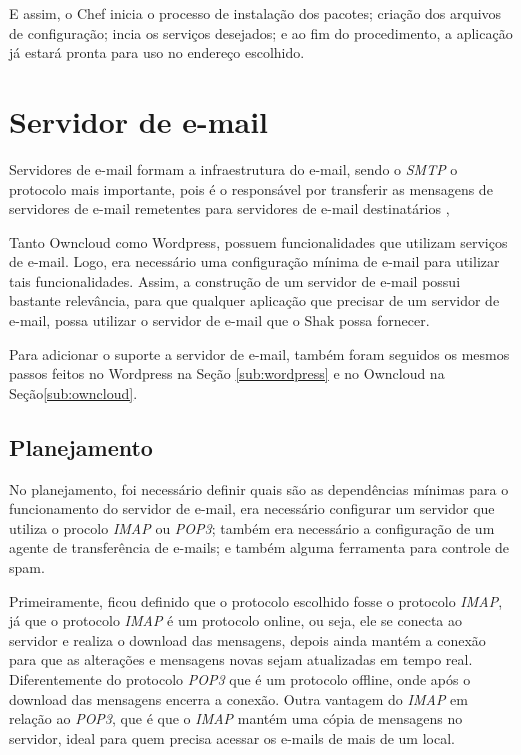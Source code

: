 E assim, o Chef inicia o processo de instalação dos pacotes; criação dos arquivos
de configuração; incia os serviços desejados; e ao fim do procedimento, a aplicação
já estará pronta para uso no endereço escolhido.

\section{Servidor de e-mail}
\label{sub:e-mail}

Servidores de e-mail formam a infraestrutura do e-mail, sendo o \textit{SMTP} o protocolo
mais importante, pois é o responsável por transferir as mensagens de servidores
de e-mail remetentes para servidores de e-mail destinatários \cite{kurose2010redes}, 

Tanto Owncloud como Wordpress, possuem funcionalidades que utilizam serviços 
de e-mail. Logo, era necessário uma configuração mínima de e-mail para utilizar 
tais funcionalidades. Assim, a construção de um servidor de e-mail 
possui bastante relevância, para que qualquer aplicação que precisar de um 
servidor de e-mail, possa utilizar o servidor de e-mail que o Shak possa fornecer.

Para adicionar o suporte a servidor de e-mail, também foram seguidos os mesmos passos
feitos no Wordpress na Seção \ref{sub:wordpress} e no Owncloud na Seção\ref{sub:owncloud}. 

\subsection{Planejamento}

No planejamento, foi necessário definir
quais são as dependências mínimas para o funcionamento do servidor de e-mail, era 
necessário configurar um servidor que utiliza o procolo \textit{IMAP} ou \textit{POP3};
também era necessário a configuração de um agente de transferência de e-mails; e também
alguma ferramenta para controle de spam.

Primeiramente, ficou definido que o protocolo escolhido fosse o protocolo \textit{IMAP}, já
que o protocolo \textit{IMAP} é um protocolo online, ou seja, ele se conecta ao servidor
e realiza o download das mensagens, depois ainda  mantém a conexão para que
as alterações e mensagens novas sejam atualizadas em tempo real. Diferentemente do
protocolo \textit{POP3} que é um protocolo offline, onde após o download das mensagens encerra
a conexão. Outra vantagem do \textit{IMAP} em relação ao \textit{POP3}, que é que o 
\textit{IMAP} mantém uma cópia de mensagens no servidor, ideal para quem precisa 
acessar os e-mails de mais de um local.

